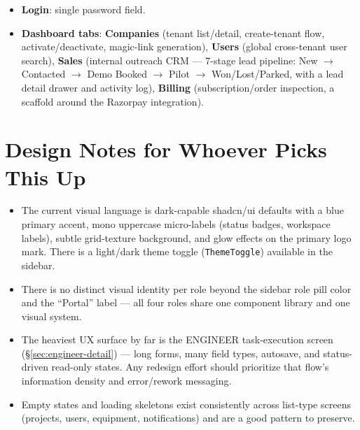 \documentclass[11pt]{article}
\begin{document}
\begin{itemize}[nosep]
  \item \textbf{Login}: single password field.
  \item \textbf{Dashboard tabs}: \textbf{Companies} (tenant list/detail, create-tenant flow,
    activate/deactivate, magic-link generation), \textbf{Users} (global cross-tenant user search),
    \textbf{Sales} (internal outreach CRM --- 7-stage lead pipeline: New $\to$ Contacted $\to$ Demo
    Booked $\to$ Pilot $\to$ Won/Lost/Parked, with a lead detail drawer and activity log),
    \textbf{Billing} (subscription/order inspection, a scaffold around the Razorpay integration).
\end{itemize}

\section{Design Notes for Whoever Picks This Up}
\begin{itemize}[nosep]
  \item The current visual language is dark-capable shadcn/ui defaults with a blue primary accent,
    mono uppercase micro-labels (status badges, workspace labels), subtle grid-texture background,
    and glow effects on the primary logo mark. There is a light/dark theme toggle
    (\texttt{ThemeToggle}) available in the sidebar.
  \item There is no distinct visual identity per role beyond the sidebar role pill color and the
    ``Portal'' label --- all four roles share one component library and one visual system.
  \item The heaviest UX surface by far is the ENGINEER task-execution screen
    (\S\ref{sec:engineer-detail}) --- long forms, many field types, autosave, and status-driven
    read-only states. Any redesign effort should prioritize that flow's information density and
    error/rework messaging.
  \item Empty states and loading skeletons exist consistently across list-type screens (projects,
    users, equipment, notifications) and are a good pattern to preserve.
\end{itemize}
\end{document}
